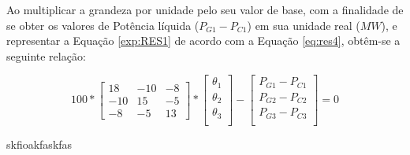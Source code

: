  	Ao multiplicar a grandeza por unidade pelo seu valor de base, com a finalidade de se obter os valores de Potência líquida ($P_{G1} - P_{C1}$) em sua unidade real ($MW$), e representar a Equação \ref{exp:RES1} de acordo com a Equação \ref{eq:res4}, obtêm-se a seguinte relação:
 	
 	\begin{equation}
		100*\begin{bmatrix}
       18 & -10 & -8 \\
       -10 & 15 & -5 \\
       -8 & -5 & 13\end{bmatrix} * 
       \begin{bmatrix}
       	\theta{_1} \\
       	\theta{_2} \\
       	\theta{_3} \\
       \end{bmatrix} - 
       \begin{bmatrix}
       	P_{G1} - P_{C1} \\
       	P_{G2} - P_{C2} \\
       	P_{G3} - P_{C3} \\
       \end{bmatrix} = 0
       \label{exp:RES2}
	\end{equation}
	
	skfioakfaskfas
 	
 	
	
	
	
	
	